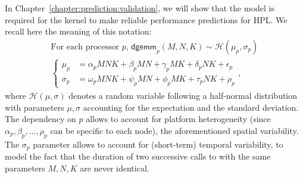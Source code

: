             In Chapter~\ref{chapter:prediction:validation}, we will show that the model  is
            required for the \dgemm kernel to make reliable performance predictions for HPL. We recall here the meaning
            of this notation:
            \begin{equation}
                \label{eq:dgemm.complex}
                \begin{split}
                    \text{For each processor $p$, } \textsf{dgemm}_{p}(M, N, K) \sim \mathcal{H}(\mu_{p}, \sigma_{p})\\
                    \begin{cases}
                        \mu_p &= \alpha_pMNK + \beta_pMN + \gamma_pMK + \delta_pNK + \epsilon_p\\
                        \sigma_p &= \omega_pMNK + \psi_pMN + \phi_pMK + \tau_pNK + \rho_p
                    \end{cases},
                \end{split}
            \end{equation}
            where \(\mathcal{H}(\mu, \sigma)\) denotes a random variable following a half-normal distribution with
            parameters \(\mu,\sigma\) accounting for the expectation and the standard deviation. The dependency on \(p\)
            allows to account for platform heterogeneity (since \(\alpha_p,\beta_p, \dots,\rho_p\) can be specific to
            each node), \ie the aforementioned spatial variability. The \(\sigma_p\) parameter allows to account for
            (short-term) temporal variability, \ie to model the fact that the duration of two successive calls to \dgemm
            with the same parameters \(M, N, K\) are never identical.

